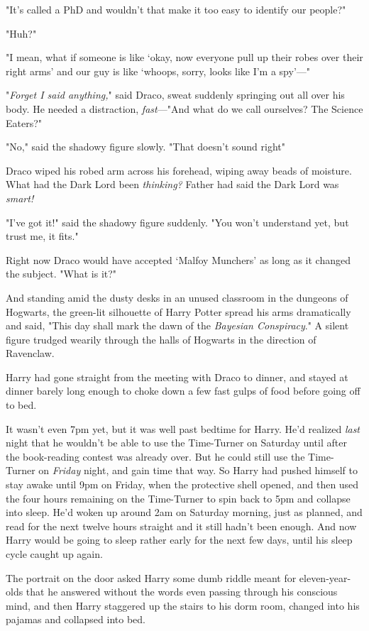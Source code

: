 "It's called a PhD and wouldn't that make it too easy to identify our people?"

"Huh?"

"I mean, what if someone is like `okay, now everyone pull up their robes over
their right arms' and our guy is like `whoops, sorry, looks like I'm a spy'—"

"\emph{Forget I said anything,}" said Draco, sweat suddenly springing out all
over his body. He needed a distraction, \emph{fast}—"And what do we call
ourselves? The Science Eaters?"

"No," said the shadowy figure slowly. "That doesn't sound right{\el}"

Draco wiped his robed arm across his forehead, wiping away beads of moisture.
What had the Dark Lord been \emph{thinking?} Father had said the Dark Lord was
\emph{smart!}

"I've got it!" said the shadowy figure suddenly. "You won't understand yet, but
trust me, it fits."

Right now Draco would have accepted `Malfoy Munchers' as long as it changed the
subject. "What is it?"

And standing amid the dusty desks in an unused classroom in the dungeons of
Hogwarts, the green-lit silhouette of Harry Potter spread his arms dramatically
and said, "This day shall mark the dawn of{\el} the \emph{Bayesian
Conspiracy}."
\sbreak
A silent figure trudged wearily through the halls of Hogwarts in the direction
of Ravenclaw.

Harry had gone straight from the meeting with Draco to dinner, and stayed at
dinner barely long enough to choke down a few fast gulps of food before going
off to bed.

It wasn't even 7pm yet, but it was well past bedtime for Harry. He'd realized
\emph{last} night that he wouldn't be able to use the Time-Turner on Saturday
until after the book-reading contest was already over. But he could still use
the Time-Turner on \emph{Friday} night, and gain time that way. So Harry had
pushed himself to stay awake until 9pm on Friday, when the protective shell
opened, and then used the four hours remaining on the Time-Turner to spin back
to 5pm and collapse into sleep. He'd woken up around 2am on Saturday morning,
just as planned, and read for the next twelve hours straight{\el} and it
still hadn't been enough. And now Harry would be going to sleep rather early
for the next few days, until his sleep cycle caught up again.

The portrait on the door asked Harry some dumb riddle meant for
eleven-year-olds that he answered without the words even passing through his
conscious mind, and then Harry staggered up the stairs to his dorm room,
changed into his pajamas and collapsed into bed.

